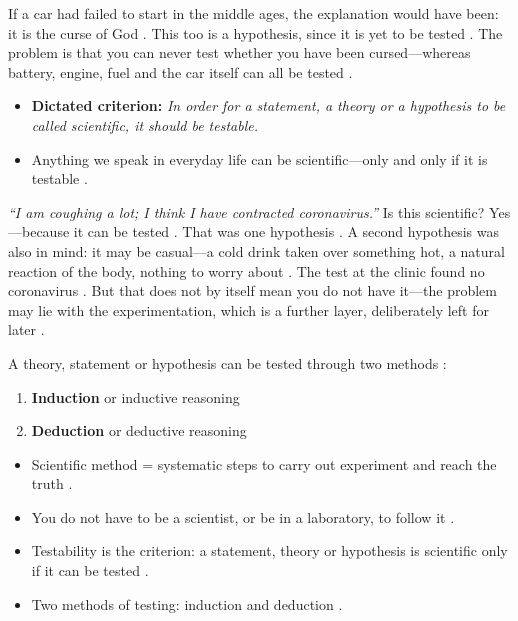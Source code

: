 \begin{ExampleBox}
If a car had failed to start in the middle ages, the explanation would have been: it is the curse of God . This too is a hypothesis, since it is yet to be tested . The problem is that you can never test whether you have been cursed---whereas battery, engine, fuel and the car itself can all be tested .
\end{ExampleBox}

\begin{KeyConcept}
\begin{itemize}
    \item \textbf{Dictated criterion:} \textit{In order for a statement, a theory or a hypothesis to be called scientific, it should be testable.} 
    \item Anything we speak in everyday life can be scientific---only and only if it is testable .
\end{itemize}
\end{KeyConcept}

\begin{ExampleBox}
\textit{``I am coughing a lot; I think I have contracted coronavirus.''}  Is this scientific? Yes---because it can be tested . That was one hypothesis . A second hypothesis was also in mind: it may be casual---a cold drink taken over something hot, a natural reaction of the body, nothing to worry about . The test at the clinic found no coronavirus . But that does not by itself mean you do not have it---the problem may lie with the experimentation, which is a further layer, deliberately left for later .
\end{ExampleBox}

\begin{KeyConcept}
A theory, statement or hypothesis can be tested through two methods :
\begin{enumerate}
    \item \textbf{Induction} or inductive reasoning 
    \item \textbf{Deduction} or deductive reasoning 
\end{enumerate}
\end{KeyConcept}

\begin{QuickRevision}
\begin{itemize}
    \item Scientific method = systematic steps to carry out experiment and reach the truth .
    \item You do not have to be a scientist, or be in a laboratory, to follow it .
    \item Testability is the criterion: a statement, theory or hypothesis is scientific only if it can be tested .
    \item Two methods of testing: induction and deduction .
\end{itemize}
\end{QuickRevision}

